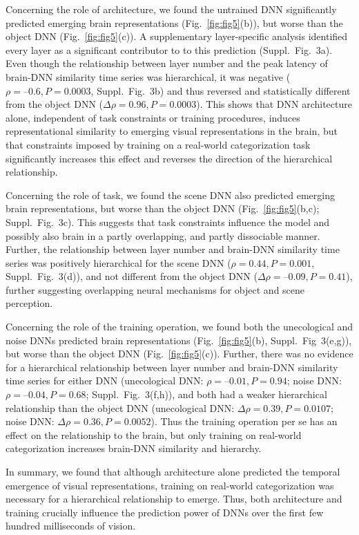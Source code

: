 \documentclass[10pt,twocolumn,letterpaper]{article}
\begin{document}
Concerning the role of architecture, we found the untrained DNN significantly predicted emerging brain representations (Fig.~\ref{fig:fig5}(b)), but worse than the object DNN (Fig.~\ref{fig:fig5}(c)). A supplementary layer-specific analysis identified every layer as a significant contributor to to this prediction (Suppl.~Fig.~3a). Even though the relationship between layer number and the peak latency of brain-DNN similarity time series was hierarchical, it was negative ($\rho = –0.6, P = 0.0003$, Suppl.~Fig.~3b) and thus reversed and statistically different from the object DNN ($\Delta\rho = 0.96, P = 0.0003$). This shows that DNN architecture alone, independent of task constraints or training procedures, induces representational similarity to emerging visual representations in the brain, but that constraints imposed by training on a real-world categorization task significantly increases this effect and reverses the direction of the hierarchical relationship.

Concerning the role of task, we found the scene DNN also predicted emerging brain representations, but worse than the object DNN (Fig.~\ref{fig:fig5}(b,c); Suppl.~Fig.~3c). This suggests that task constraints influence the model and possibly also brain in a partly overlapping, and partly dissociable manner. Further, the relationship between layer number and brain-DNN similarity time series was positively hierarchical for the scene DNN ($\rho = 0.44, P = 0.001$, Suppl.~Fig.~3(d)), and not different from the object DNN ($\Delta\rho = –0.09, P = 0.41$), further suggesting overlapping neural mechanisms for object and scene perception.

Concerning the role of the training operation, we found both the unecological and noise DNNs predicted brain representations (Fig.~\ref{fig:fig5}(b), Suppl.~Fig~3(e,g)), but worse than the object DNN (Fig.~\ref{fig:fig5}(c)). Further, there was no evidence for a hierarchical relationship between layer number and brain-DNN similarity time series for either DNN (unecological DNN: $\rho = –0.01, P = 0.94$; noise DNN: $\rho = –0.04, P = 0.68$; Suppl.~Fig.~3(f,h)), and both had a weaker hierarchical relationship than the object DNN (unecological DNN: $\Delta\rho = 0.39, P = 0.0107$; noise DNN: $\Delta\rho = 0.36, P = 0.0052$). Thus the training operation per se has an effect on the relationship to the brain, but only training on real-world categorization increases brain-DNN similarity and hierarchy.

In summary, we found that although architecture alone predicted the temporal emergence of visual representations, training on real-world categorization was necessary for a hierarchical relationship to emerge. Thus, both architecture and training crucially influence the prediction power of DNNs over the first few hundred milliseconds of vision.
\end{document}
